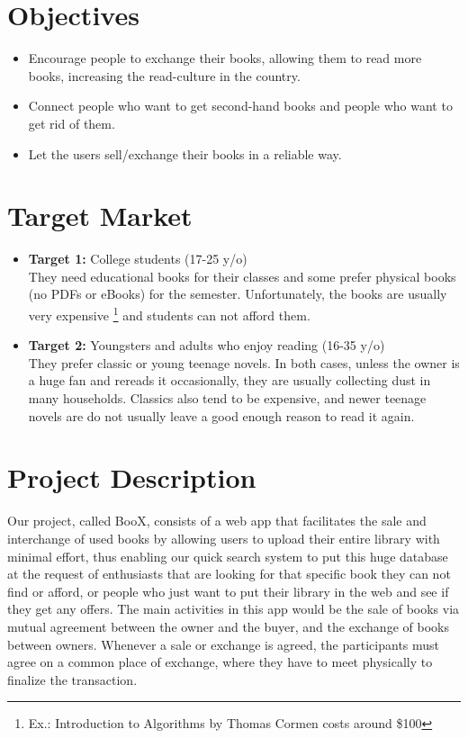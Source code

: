 \documentclass{article}
\begin{document}
\section{Objectives}
\begin{itemize}
    \item Encourage people to exchange their books, allowing them to read more books, increasing the read-culture in the country. 
    \item Connect people who want to get second-hand books and people who want to get rid of them. 
    \item Let the users sell/exchange their books in a reliable way.
\end{itemize}

\section{Target Market}
\begin{itemize}[label={}]
    \item \textbf{Target 1:} College students (17-25 y/o)\\
    They need educational books for their classes and some prefer physical books (no PDFs or eBooks) for the semester. Unfortunately, the books are usually very expensive \footnote{Ex.: Introduction to Algorithms by Thomas Cormen costs around \$100} and students can not afford them.
    \item \textbf{Target 2:} Youngsters and adults who enjoy reading (16-35 y/o)\\
    They prefer classic or young teenage novels. In both cases, unless the owner is a huge fan and rereads it occasionally, they are usually collecting dust in many households. Classics also tend to be expensive, and newer teenage novels are do not usually leave a good enough reason to read it again.
    
\end{itemize}

\section{Project Description}

Our project, called BooX, consists of a web app that facilitates the sale and interchange of used books by allowing users to upload their entire library with minimal effort, thus enabling our quick search system to put this huge database at the request of enthusiasts that are looking for that specific book they can not find or afford, or people who just want to put their library in the web and see if they get any offers. The main activities in this app would be the sale of books via mutual agreement between the owner and the buyer, and the exchange of books between owners. Whenever a sale or exchange is agreed, the participants must agree on a common place of exchange, where they have to meet physically to finalize the transaction.
\end{document}
